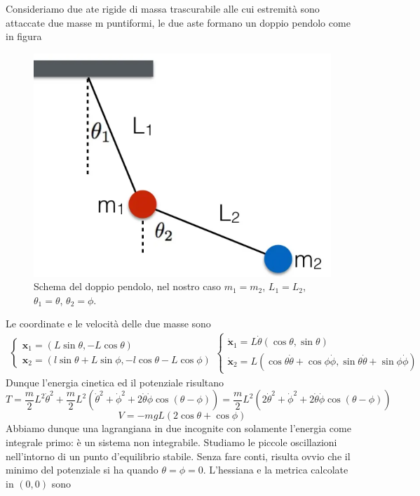 \documentclass[
10pt, %
a4paper, %
oneside, %
headinclude,footinclude, %
BCOR5mm, %
]{scrartcl}
\begin{document}
\begin{esercizio}
Consideriamo due ate rigide di massa trascurabile alle cui estremità sono attaccate due masse m puntiformi, le due aste formano un doppio pendolo come in figura
\begin{figure}[h!]
	\centering
	\includegraphics[width=0.6\linewidth]{doppio-pendolo}
	\caption{Schema del doppio pendolo, nel nostro caso \(m_1 = m_2\), \(L_1 = L_2\), \(\theta_1 = \theta\), \(\theta_2 = \phi\).}
	\label{fig:doppio-pendolo}
\end{figure}
\FloatBarrier	
Le coordinate e le velocità delle due masse sono
\begin{align*}
	\begin{cases}
		\mathbf{x}_1 = (L\sin\theta, -L\cos\theta)\\
		\mathbf{x}_2 = (l\sin\theta+L\sin\phi, -l\cos\theta-L\cos\phi)
	\end{cases}
	\begin{cases}
		\dot{\mathbf{x}}_1 = L\dot{\theta}(\cos\theta, \sin\theta)\\
		\dot{\mathbf{x}}_2 = L(\cos\theta\dot{\theta}+\cos\phi\dot{\phi}, \sin\theta\dot{\theta}+\sin\phi\dot{\phi})
	\end{cases}
\end{align*}
Dunque l'energia cinetica ed il potenziale risultano
\[T = \frac{m}{2}L^2\dot{\theta}^2+\frac{m}{2}L^2(\dot{\theta}^2+\dot{\phi}^2+2\dot{\theta}\dot{\phi}\cos(\theta-\phi)) = \frac{m}{2}L^2(2\dot{\theta}^2+\dot{\phi}^2+2\dot{\theta}\dot{\phi}\cos(\theta-\phi))\]	
\[V = -mgL(2\cos\theta +\cos\phi)\]
Abbiamo dunque una lagrangiana in due incognite con solamente l'energia come integrale primo: è un sistema non integrabile. Studiamo le piccole oscillazioni nell'intorno di un punto d'equilibrio stabile. Senza fare conti, risulta ovvio che il minimo del potenziale si ha quando \(\theta =\phi = 0\). L'hessiana e la metrica calcolate in \((0, 0)\) sono
\begin{align*}

\end{align*}
\end{esercizio}
\end{document}
